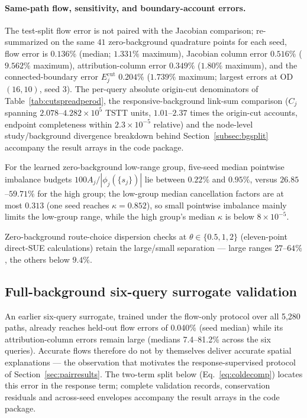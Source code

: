 \paragraph{Same-path flow, sensitivity, and boundary-account errors.}
The test-split flow error is not paired with the Jacobian comparison;
re-summarized on the same $41$ zero-background quadrature points for
each seed, flow error is $0.136\%$ (median; $1.331\%$ maximum),
Jacobian column error $0.516\%$ ($9.562\%$ maximum), attribution-column
error $0.349\%$ ($1.80\%$ maximum), and the connected-boundary error
$E_j^{\mathrm{cut}}$ $0.204\%$ ($1.739\%$ maximum; largest errors at
OD $(16,10)$, seed $3$). The per-query absolute origin-cut
denominators of Table~\ref{tab:cutspreadperod}, the responsive-background
link-sum comparison ($C_j$ spanning $2.078$--$4.282\times10^5$ TSTT
units, $1.01$--$2.37$ times the origin-cut accounts, endpoint
completeness within $2.3\times10^{-5}$ relative) and the node-level
study/background divergence breakdown behind
Section~\ref{subsec:bgsplit} accompany the result arrays in the code
package.

For the learned zero-background low-range group, five-seed median pointwise
imbalance budgets $100A_j/|\phi_j(\{s_j\})|$ lie between $0.22\%$ and
$0.95\%$, versus $26.85$--$59.71\%$ for the high group; the low-group
median cancellation factors are at most $0.313$ (one seed reaches
$\kappa=0.852$), so small pointwise imbalance mainly limits the
low-group range, while the high group's median $\kappa$ is below
$8\times10^{-5}$.

Zero-background route-choice dispersion checks at $\theta\in\{0.5,1,2\}$
(eleven-point direct-SUE calculations) retain the large/small
separation --- large ranges $27$--$64\%$, the others below $9.4\%$.

\subsection{Full-background six-query surrogate validation}\label{supp:fullbgsurrogate}
An earlier six-query surrogate, trained under the flow-only protocol
over all 5,280 paths, already reaches held-out flow errors of
0.040\% (seed median) while its attribution-column errors remain
large (medians 7.4--81.2\% across the six queries). Accurate flows
therefore do not by themselves deliver accurate spatial explanations
--- the observation that motivates the response-supervised protocol of
Section~\ref{sec:pairresults}. The two-term split below
(Eq.~\eqref{eq:coldecomp}) locates this error in the response term;
complete validation records, conservation residuals and across-seed
envelopes accompany the result arrays in the code package.

